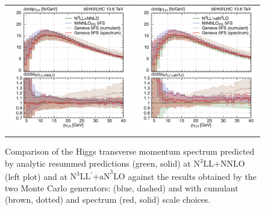 \documentclass[11pt,a4paper]{article}
\begin{document}
\begin{figure}[t!]
\begin{center}
\begin{tabular}{cc}
\includegraphics[width=.45\textwidth, page=1]{plots/5fs/genevaminnlo/n3llnnloresvsMCs-withspectrum.pdf}&
\includegraphics[width=.45\textwidth, page=1]{plots/5fs/genevaminnlo/n3llan3loresvsMCs-withspectrum.pdf}
\end{tabular}
\vspace*{1ex}
\caption{Comparison of the Higgs transverse momentum spectrum predicted by analytic resummed predictions (green, solid) at $\text{N}^3\text{LL+NNLO}$ (left plot) and at $\text{N}^3\text{LL$^{\prime}$+aN}^3\text{LO}$ against the results obtained by the two Monte Carlo generators: \minnlo{} (blue, dashed) and \GENEVA{} with cumulant (brown, dotted) and spectrum (red, solid) scale choices. \label{fig:resVSMCs}}
\end{center}
\end{figure}
\end{document}
